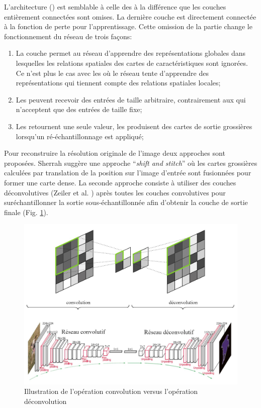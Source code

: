 L’architecture (\acrfcnns) est semblable à celle des \acrconvnet à la différence que les couches entièrement connectées sont omises. La dernière couche est directement connectée à la fonction de perte pour l’apprentissage. Cette omission de la partie \acrmlp change le fonctionnement du réseau de trois façons: 
\begin{enumerate}
    \item La couche \acrmlp permet au réseau d’apprendre des représentations globales dans lesquelles les relations spatiales des cartes de caractéristiques sont ignorées. Ce n'est plus le cas avec les \acrfcn où le réseau tente d'apprendre des représentations qui tiennent compte  des relations spatiales locales;
     \item Les \acrfcn peuvent recevoir des entrées de taille arbitraire, contrairement aux \acrconvnet qui n’acceptent que des entrées de taille fixe;
    \item Les \acrconvnet retournent une seule valeur, les \acrfcn produisent des cartes de sortie grossières lorsqu'un ré-échantillonnage est appliqué;
\end{enumerate}
Pour reconstruire la résolution originale de l’image deux approches sont proposées. Sherrah \cite{Sherrah2016FullyCN} suggère une approche “\textit{shift and stitch}” où les cartes grossières calculées par translation de la position sur l’image d’entrée sont fusionnées pour former une carte dense.  La seconde approche consiste à utiliser des couches déconvolutives (Zeiler et al. \cite{Zeiler10deconvolutionalnetworks}) après toutes les couches convolutives pour suréchantillonner la sortie sous-échantillonnée afin d'obtenir la couche de sortie finale (Fig. \ref{fig:conv-deconv-block-diagram}).

\begin{figure}[!htbp] 
  \includegraphics[width=0.85\linewidth]{figures/deconvolution.jpg}
   \caption{\small{Illustration de l'opération convolution versus l'opération déconvolution}}
  \label{fig:conv-deconv-block-diagram}
\end{figure}

